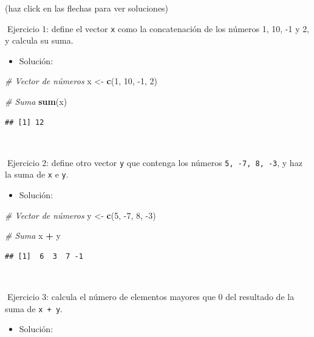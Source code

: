 \documentclass[11pt,]{book}
\newenvironment{Shaded}{\begin{snugshade}}{\end{snugshade}}
\newcommand{\CommentTok}[1]{\textcolor[rgb]{0.37,0.37,0.37}{\textit{#1}}}
\newcommand{\DecValTok}[1]{\textcolor[rgb]{0.06,0.06,0.06}{#1}}
\newcommand{\KeywordTok}[1]{\textcolor[rgb]{0.27,0.27,0.27}{\textbf{#1}}}
\newcommand{\NormalTok}[1]{#1}
\newcommand{\OperatorTok}[1]{\textcolor[rgb]{0.43,0.43,0.43}{\textbf{#1}}}
\newcommand{\StringTok}[1]{\textcolor[rgb]{0.5,0.5,0.5}{#1}}
\providecommand{\tightlist}{%
  \setlength{\itemsep}{0pt}\setlength{\parskip}{0pt}}
\begin{document}
(haz click en las flechas para ver soluciones)

📝Ejercicio 1: define el vector \texttt{x} como la concatenación de los números 1, 10, -1 y 2, y calcula su suma.

\begin{itemize}
\tightlist
\item
  Solución:
\end{itemize}

\begin{Shaded}
\begin{Highlighting}[]
\CommentTok{# Vector de números}
\NormalTok{x <-}\StringTok{ }\KeywordTok{c}\NormalTok{(}\DecValTok{1}\NormalTok{, }\DecValTok{10}\NormalTok{, }\DecValTok{-1}\NormalTok{, }\DecValTok{2}\NormalTok{)}

\CommentTok{# Suma}
\KeywordTok{sum}\NormalTok{(x)}
\end{Highlighting}
\end{Shaded}

\begin{verbatim}
## [1] 12
\end{verbatim}

~

📝Ejercicio 2: define otro vector \texttt{y} que contenga los números \texttt{5,\ -7,\ 8,\ -3}, y haz la suma de \texttt{x} e \texttt{y}.

\begin{itemize}
\tightlist
\item
  Solución:
\end{itemize}

\begin{Shaded}
\begin{Highlighting}[]
\CommentTok{# Vector de números}
\NormalTok{y <-}\StringTok{ }\KeywordTok{c}\NormalTok{(}\DecValTok{5}\NormalTok{, }\DecValTok{-7}\NormalTok{, }\DecValTok{8}\NormalTok{, }\DecValTok{-3}\NormalTok{)}

\CommentTok{# Suma}
\NormalTok{x }\OperatorTok{+}\StringTok{ }\NormalTok{y}
\end{Highlighting}
\end{Shaded}

\begin{verbatim}
## [1]  6  3  7 -1
\end{verbatim}

~

📝Ejercicio 3: calcula el número de elementos mayores que 0 del resultado de la suma de \texttt{x\ +\ y}.

\begin{itemize}
\tightlist
\item
  Solución:
\end{itemize}
\end{document}
